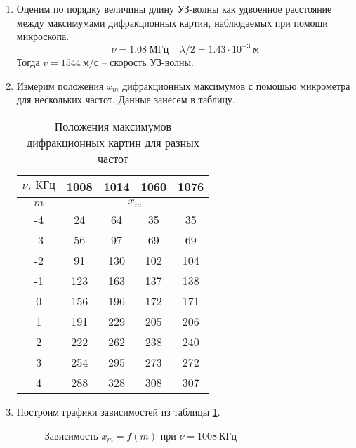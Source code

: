 \documentclass{lab}
\begin{document}
\begin{enumerate}
\item
Оценим по порядку величины длину УЗ-волны как удвоенное расстояние между максимумами дифракционных картин, наблюдаемых при помощи микроскопа.
\begin{equation}
\nu = 1.08~МГц ~~~~~ \lambda / 2 = 1.43 \cdot 10^{-3}~м
\end{equation}
Тогда $ v = 1544~м/с $ -- скорость УЗ-волны.

\item
Измерим положения $ x_m $ дифракционных максимумов с помощью микрометра для нескольких частот. Данные занесем в таблицу.
\begin{table}[H]
	\centering
	\begin{tabular}{|c|cccc|}
		\hline
		$ \nu,~КГц $ & 1008 & 1014 & 1060 & 1076 \\ \hline
		$ m $        & \multicolumn{4}{c|}{$ x_m $}\\ \hline
		-4 & 24  & 64  & 35  & 35  \\
		-3 & 56  & 97  & 69  & 69  \\
		-2 & 91  & 130 & 102 & 104 \\
		-1 & 123 & 163 & 137 & 138 \\
		0  & 156 & 196 & 172 & 171 \\
		1  & 191 & 229 & 205 & 206 \\
		2  & 222 & 262 & 238 & 240 \\
		3  & 254 & 295 & 273 & 272 \\
		4  & 288 & 328 & 308 & 307 \\ \hline
	\end{tabular}
	\caption{Положения максимумов дифракционных картин для разных частот}
	\label{tab 1}
\end{table}

\item
Построим графики зависимостей из таблицы \ref{tab 1}.
\begin{figure}[H]
\centering
{}
\caption{Зависимость $ x_m = f(m) $ при $ \nu = 1008~КГц $}
\label{1}
\end{figure}


\end{enumerate}
\end{document}
